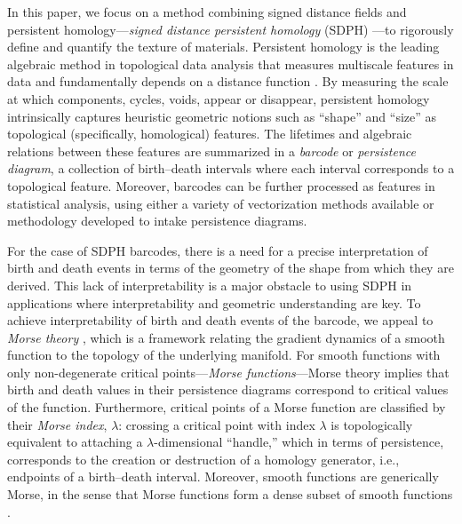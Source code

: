 \documentclass[11pt]{article}
\theoremstyle{plain}
\theoremstyle{definition}
\theoremstyle{remark}
\begin{document}
	In this paper, we focus on a method combining signed distance fields and persistent homology---\emph{signed distance persistent homology} (SDPH) \citep{delgado-friedrichs_morse_2014, delgado-friedrichs_skeletonization_2015, herring_topological_2019, moon_statistical_2019}---to rigorously define and quantify the texture of materials. Persistent homology is the leading algebraic method in topological data analysis that measures multiscale features in data and fundamentally depends on a distance function \citep{edelsbrunner_persistent_2008,ghrist_barcodes_2008,carlsson_topology_2009}.  By measuring the scale at which components, cycles, voids, appear or disappear, persistent homology intrinsically captures heuristic geometric notions such as ``shape'' and ``size'' as topological (specifically, homological) features. The lifetimes and algebraic relations between these features are summarized in a \emph{barcode} or \textit{persistence diagram}, a collection of birth--death intervals where each interval corresponds to a topological feature. Moreover, barcodes can be further processed as features in statistical analysis, using either a variety of vectorization methods available or methodology developed to intake persistence diagrams.
	
	For the case of SDPH barcodes, there is a need for a precise interpretation of birth and death events in terms of the geometry of the shape from which they are derived. This lack of interpretability is a major obstacle to using SDPH in applications where interpretability and geometric understanding are key. To achieve interpretability of birth and death events of the barcode, we appeal to \emph{Morse theory} \citep{milnor_morse_1963}, which is a framework relating the gradient dynamics of a smooth function to the topology of the underlying manifold.  For smooth functions with only non-degenerate critical points---\emph{Morse functions}---Morse theory implies that birth and death values in their persistence diagrams correspond to critical values of the function. Furthermore, critical points of a Morse function are classified by their \emph{Morse index}, $\lambda$: crossing a critical point with index $\lambda$ is topologically equivalent to attaching a $\lambda$-dimensional ``handle,'' which in terms of persistence, corresponds to the  creation or destruction of a homology generator, i.e., endpoints of a birth--death interval. Moreover, smooth functions are generically Morse, in the sense that Morse functions form a dense subset of smooth functions \cite[Chapter 6]{hirsch_differential_1976}.
	
\end{document}
